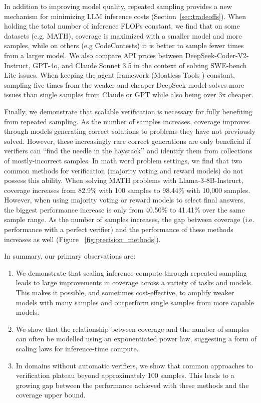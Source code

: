 \documentclass[11pt]{article}
\begin{document}
In addition to improving model quality, repeated sampling provides a new mechanism for minimizing LLM inference costs (Section~\ref{sec:tradeoffs}). When holding the total number of inference FLOPs constant, we find that on some datasets (e.g. MATH), coverage is maximized with a smaller model and more samples, while on others (e.g CodeContests) it is better to sample fewer times from a larger model. We also compare API prices between DeepSeek-Coder-V2-Instruct, GPT-4o, and Claude Sonnet 3.5 in the context of solving SWE-bench Lite issues. When keeping the agent framework (Moatless Tools \citep{moatless}) constant, sampling five times from the weaker and cheaper DeepSeek model solves more issues than single samples from Claude or GPT while also being over 3x cheaper.

Finally, we demonstrate that scalable verification is necessary for fully benefiting from repeated sampling. As the number of samples increases, coverage improves through models generating correct solutions to problems they have not previously solved. However, these increasingly rare correct generations are only beneficial if verifiers can ``find the needle in the haystack’’ and identify them from collections of mostly-incorrect samples. 
In math word problem settings, we find that two common methods for verification (majority voting and reward models) do not possess this ability.
When solving MATH \citep{hendrycks2021measuringmath} problems with Llama-3-8B-Instruct, coverage increases from 82.9\% with 100 samples to 98.44\% with 10,000 samples. However, when using majority voting or reward models to select final answers, the biggest performance increase is only from 40.50\% to 41.41\% over the same sample range. As the number of samples increases, the gap between coverage (i.e. performance with a perfect verifier) and the performance of these methods increases as well (Figure ~\ref{fig:precision_methods}).

In summary, our primary observations are:

\begin{enumerate}
    \item We demonstrate that scaling inference compute through repeated sampling leads to large improvements in coverage across a variety of tasks and models. This makes it possible, and sometimes cost-effective, to amplify weaker models with many samples and outperform single samples from more capable models.

    \item We show that the relationship between coverage and the number of samples can often be modelled using an exponentiated power law, suggesting a form of scaling laws for inference-time compute.  

    \item In domains without automatic verifiers, we show that common approaches to verification plateau beyond approximately 100 samples. This leads to a growing gap between the performance achieved with these methods and the coverage upper bound.
\end{enumerate}
\end{document}
